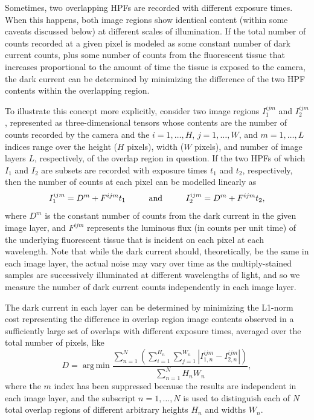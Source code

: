 \documentclass[letterpaper,11pt]{article}
\DeclareMathOperator*{\argmin}{arg\,min}
\begin{document}
Sometimes, two overlapping HPFs are recorded with different exposure times. When this happens, both image regions show identical content (within some caveats discussed below) at different scales of illumination. If the total number of counts recorded at a given pixel is modeled as some constant number of dark current counts, plus some number of counts from the fluorescent tissue that increases proportional to the amount of time the tissue is exposed to the camera, the dark current can be determined by minimizing the difference of the two HPF contents within the overlapping region.

To illustrate this concept more explicitly, consider two image regions $I^{ijm}_{1}$ and $I^{ijm}_{2}$, represented as three-dimensional tensors whose contents are the number of counts recorded by the camera and the $i=1, \ldots, H$, $j = 1, \ldots, W$, and $m = 1, \ldots, L$ indices range over the height ($H$ pixels), width ($W$ pixels), and number of image layers $L$, respectively, of the overlap region in question. If the two HPFs of which $I_{1}$ and $I_{2}$ are subsets are recorded with exposure times $t_{1}$ and $t_{2}$, respectively, then the number of counts at each pixel can be modelled linearly as
\begin{equation}
I^{ijm}_{1} = D^{m} + F^{ijm} t_{1} \hspace{0.08\textwidth} \mathrm{and} \hspace{0.08\textwidth} I^{ijm}_{2} = D^{m} + F^{ijm} t_{2},
\end{equation}
where $D^{m}$ is the constant number of counts from the dark current in the given image layer, and $F^{ijm}$ represents the luminous flux (in counts per unit time) of the underlying fluorescent tissue that is incident on each pixel at each wavelength. Note that while the dark current should, theoretically, be the same in each image layer, the actual noise may vary over time as the multiply-stained samples are successively illuminated at different wavelengths of light, and so we measure the number of dark current counts independently in each image layer.

The dark current in each layer can be determined by minimizing the L1-norm cost representing the difference in overlap region image contents observed in a sufficiently large set of overlaps with different exposure times, averaged over the total number of pixels, like
\begin{equation}
D = \argmin{ \frac{ \sum_{n=1}^{N} \left( \sum_{i=1}^{H_{n}} \sum_{j=1}^{W_{n}} \left| I^{ijm}_{1,n} - I^{ijm}_{2,n} \right| \right) }{ \sum_{n=1}^{N} H_{n}W_{n}} },
\end{equation} 
where the $m$ index has been suppressed because the results are independent in each image layer, and the subscript $n=1,\ldots,N$ is used to distinguish each of $N$ total overlap regions of different arbitrary heights $H_{n}$ and widths $W_{n}$. 
\end{document}

